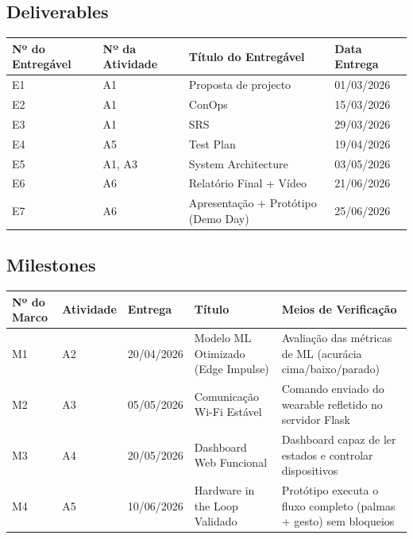 \documentclass[11pt, a4paper]{article}
\begin{document}
\subsection{Deliverables}
\begin{table}[H]
    \small
    \centering
    \begin{tabular}{|p{}|p{}|p{}|p{}|}
        \hline
        \cellcolor{lightgray}\textbf{Nº do Entregável} &
        \cellcolor{lightgray}\textbf{Nº da Atividade} &
        \cellcolor{lightgray}\textbf{Título do Entregável} &
        \cellcolor{lightgray}\textbf{Data Entrega} \\
        \hline
        E1 & A1 & Proposta de projecto & 01/03/2026 \\
        \hline
        E2 & A1 & ConOps & 15/03/2026 \\
        \hline
        E3 & A1 & SRS & 29/03/2026 \\
        \hline
        E4 & A5 & Test Plan & 19/04/2026 \\
        \hline
        E5 & A1, A3 & System Architecture & 03/05/2026 \\
        \hline
        E6 & A6 & Relatório Final + Vídeo & 21/06/2026 \\
        \hline
        E7 & A6 & Apresentação + Protótipo (Demo Day) & 25/06/2026 \\
        \hline
    \end{tabular}
\end{table}

\subsection{Milestones}
\begin{table}[H]
    \small
    \centering
    \begin{tabular}{|p{}|p{}|p{}|p{}|p{}|}
        \hline
        \cellcolor{lightgray}\textbf{Nº do Marco} &
        \cellcolor{lightgray}\textbf{Atividade} &
        \cellcolor{lightgray}\textbf{Entrega} &
        \cellcolor{lightgray}\textbf{Título} &
        \cellcolor{lightgray}\textbf{Meios de Verificação} \\
        \hline
        M1 & A2 & 20/04/2026 & Modelo ML Otimizado (Edge Impulse) & Avaliação das métricas de ML (acurácia cima/baixo/parado) \\
        \hline
        M2 & A3 & 05/05/2026 & Comunicação Wi-Fi Estável & Comando enviado do wearable refletido no servidor Flask \\
        \hline
        M3 & A4 & 20/05/2026 & Dashboard Web Funcional & Dashboard capaz de ler estados e controlar dispositivos \\
        \hline
        M4 & A5 & 10/06/2026 & Hardware in the Loop Validado & Protótipo executa o fluxo completo (palmas + gesto) sem bloqueios \\
        \hline
    \end{tabular}
\end{table}
\end{document}

